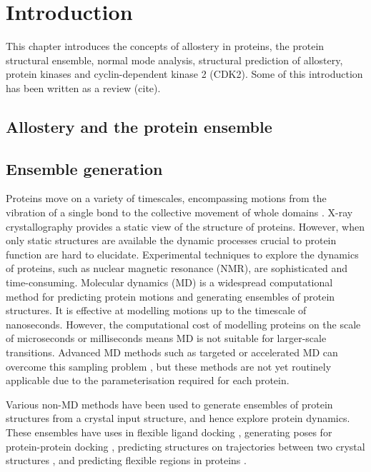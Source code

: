 \chapter{Introduction}
\label{cha:introduction}

This chapter introduces the concepts of allostery in proteins, the protein structural ensemble, normal mode analysis, structural prediction of allostery, protein kinases and cyclin-dependent kinase 2 (CDK2).
Some of this introduction has been written as a review (cite).


\section{Allostery and the protein ensemble}


\section{Ensemble generation}

Proteins move on a variety of timescales, encompassing motions from the vibration of a single bond to the collective movement of whole domains \cite{Henzler-Wildman2007, Wei2016}.
X-ray crystallography provides a static view of the structure of proteins.
However, when only static structures are available the dynamic processes crucial to protein function \cite{Henzler-Wildman2007b} are hard to elucidate.
Experimental techniques to explore the dynamics of proteins, such as nuclear magnetic resonance (NMR), are sophisticated and time-consuming.
Molecular dynamics (MD) is a widespread computational method for predicting protein motions and generating ensembles of protein structures.
It is effective at modelling motions up to the timescale of nanoseconds.
However, the computational cost of modelling proteins on the scale of microseconds or milliseconds means MD is not suitable for larger-scale transitions.
Advanced MD methods such as targeted or accelerated MD can overcome this sampling problem \cite{Maximova2016}, but these methods are not yet routinely applicable due to the parameterisation required for each protein.

Various non-MD methods have been used to generate ensembles of protein structures from a crystal input structure, and hence explore protein dynamics.
These ensembles have uses in flexible ligand docking \cite{Totrov2008}, generating poses for protein-protein docking \cite{Mustard2005}, predicting structures on trajectories between two crystal structures \cite{Weiss2009}, and predicting flexible regions in proteins \cite{Ahmed2011}.

